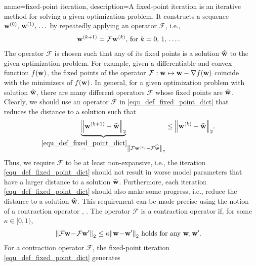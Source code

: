 {
{name={fixed-point iteration},
	description={A fixed-point iteration is an iterative method for solving 
		a given optimization problem. It constructs a sequence ${\bf w}^{(0)}, \,{\bf w}^{(1)}, \,\ldots$ by 
		 repeatedly applying an operator $\mathcal{F}$, i.e., 
		 \begin{equation} 
		 	\label{equ_def_fixed_point_dict} 
		 	{\bf w}^{(k+1)} = \mathcal{F} {\bf w}^{(k)} \mbox{, for } k=0, \,1, \,\ldots.
		 \end{equation} 
		 The operator $\mathcal{F}$ is chosen such that any of its fixed points is a solution 
		 $\widehat{{\bf w}}$ to the given optimization problem. For example, given a differentiable and 
		 convex function $f({\bf w})$, the fixed points of the operator $\mathcal{F}: {\bf w} \mapsto {\bf w} - \nabla f({\bf w})$ 
		 coincide with the minimizers of $f({\bf w})$. In general, for a given optimization problem with solution $\widehat{{\bf w}}$, 
		 there are many different operators $\mathcal{F}$ whose fixed points are $\widehat{{\bf w}}$. 
		 Clearly, we should use an operator $\mathcal{F}$ in \eqref{equ_def_fixed_point_dict} that reduces the distance to a solution such that
		 \begin{equation} 
			\nonumber
			\underbrace{\mleft\lVert  {\bf w}^{(k+1)} - \widehat{\mathbf{w}} \mright\rVert_{2}}_{\stackrel{\eqref{equ_def_fixed_point_dict}}{=} \mleft\lVert  \mathcal{F} {\bf w}^{(k)} - \mathcal{F}\widehat{{\bf w}} \mright\rVert_{2}}  \leq 	\mleft\lVert  {\bf w}^{(k)} - \widehat{{\bf w}} \mright\rVert_{2}. 
		\end{equation}
		Thus, we require $\mathcal{F}$ to be at least non-expansive, i.e., the iteration \eqref{equ_def_fixed_point_dict} 
		should not result in worse model parameters that have a larger distance to a solution $\widehat{{\bf w}}$. 
		Furthermore, each iteration \eqref{equ_def_fixed_point_dict} should also make some progress, i.e., 
		reduce the distance to a solution $\widehat{{\bf w}}$. This requirement can be made precise using 
		the notion of a contraction operator \cite{Bauschke:2017}, \cite{fixedpoinIsta}. 
		The operator $\mathcal{F}$ is a contraction operator if, for some $\kappa \in [0,1)$,
		\begin{equation} 
			\nonumber
			\mleft\lVert  \mathcal{F} {\bf w}\!-\!\mathcal{F} {\bf w}' \mright\rVert_{2}  \leq  \kappa	\mleft\lVert {\bf w}\!-\!{\bf w}' \mright\rVert_{2} \mbox{ holds for any } {\bf w},{\bf w}'.
		\end{equation}
		For a contraction operator $\mathcal{F}$, the fixed-point iteration \eqref{equ_def_fixed_point_dict} generates 
}}}
